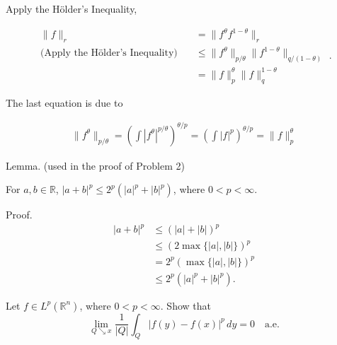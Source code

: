 \documentclass[UTF8,a4paper,10pt]{article}
\begin{document}
\begin{solution}
Apply the Hölder’s Inequality,

\begin{equation*}
  \begin{aligned}
    \| f \|_r &= \| f^{\theta} f^{1-\theta} \|_r \\ \text{(Apply the Hölder’s Inequality)}\quad
    &\leq \| f^\theta \|_{p/\theta} \| f^{1-\theta} \|_{q/(1-\theta)}\\
     &=\| f \|_p^\theta \| f \|_q^{1-\theta}
  \end{aligned}.
\end{equation*}

The last equation is due to

\begin{equation*}
  \begin{aligned}
    \| f^{\theta} \|_{p/\theta} =  \left( \int |f^{\theta}|^{p/\theta} \right)^{\theta/p} = \left( \int |f|^{p} \right)^{\theta/p} = \| f \|_{p}^{\theta}
  \end{aligned}
\end{equation*}


  
\end{solution}



\begin{mybox}{}
  Lemma. (used in the proof of Problem 2)
  
   For \(a, b \in \mathbb{R}\), \(|a + b|^p \leq 2^p(|a|^p + |b|^p)\), where \(0 < p < \infty\).
  
  Proof.
  \begin{equation*}
  \begin{aligned}
  |a + b|^p &\leq (|a| + |b|)^p \\
  &\leq (2 \max\{|a|, |b|\})^p \\
  &= 2^p (\max\{|a|, |b|\})^p \\
  &\leq 2^p (|a|^p + |b|^p).
  \end{aligned}
  \end{equation*}
  
  \end{mybox}

\pagebreak


\begin{Problem}[]{}

    Let $f \in L^p(\mathbb{R}^n)$, where $0 < p < \infty$. Show that
\[
\lim_{Q \searrow x} \frac{1}{|Q|} \int_Q |f(y) - f(x)|^p \, dy = 0 \quad \text{a.e.}
\]

\end{Problem}
\end{document}
